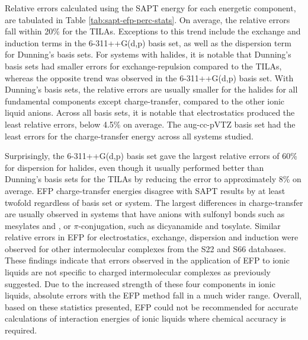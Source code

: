 Relative errors calculated using the SAPT energy for each energetic component, are tabulated in Table \ref{tab:sapt-efp-perc-stats}.
On average, the relative errors fall within 20\% for the TILAs. 
Exceptions to this trend include the exchange and induction terms in the 6-311++G(d,p) basis set, as well as the dispersion term for Dunning's basis sets.
For systems with halides, it is notable that Dunning's basis sets had smaller errors for exchange-repulsion compared to the TILAs, whereas the opposite trend was observed in the 6-311++G(d,p) basis set.
With Dunning's basis sets, the relative errors are usually smaller for the halides for all fundamental components except charge-transfer, compared to the other ionic liquid anions.
Across all basis sets, it is notable that electrostatics produced the least relative errors, below 4.5\% on average.
The aug-cc-pVTZ basis set had the least errors for the charge-transfer energy across all systems studied.


Surprisingly, the 6-311++G(d,p) basis set gave the largest relative errors of 60\% for dispersion for halides, even though it usually performed better than Dunning's basis sets for the TILAs by reducing the error to approximately 8\% on average.
EFP charge-transfer energies disagree with SAPT results by at least twofold regardless of basis set or system. 
The largest differences in charge-transfer are usually observed in systems that have anions with sulfonyl bonds such as mesylates and \ntf, or $\pi$-conjugation, such as dicyanamide and tosylate.
Similar relative errors in EFP for electrostatics, exchange, dispersion and induction were observed for other intermolecular complexes from the S22 and S66 databases.
\cite{Flick2012a}
These findings indicate that errors observed in the application of EFP to ionic liquids are not specific to charged intermolecular complexes as previously suggested.
Due to the increased strength of these four components in ionic liquids, absolute errors with the EFP method fall in a much wider range.
Overall, based on these statistics presented, EFP could not be recommended for accurate calculations of interaction energies of ionic liquids where chemical accuracy is required.
